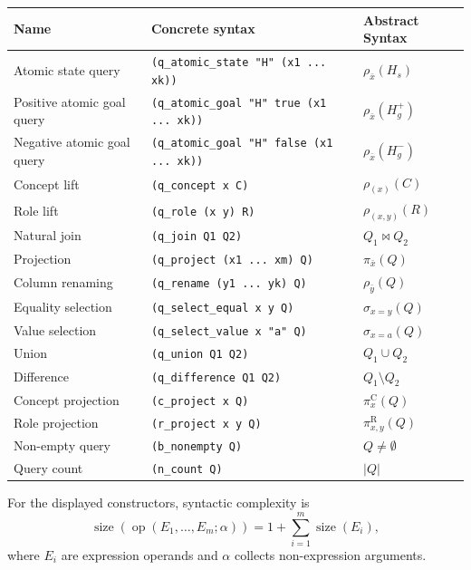 \documentclass[11pt]{article}
\newenvironment{compacttable}
  {\begingroup\setlength{\tabcolsep}{3pt}}
  {\endgroup}
\begin{document}
\begin{compacttable}
\begin{longtable}{>{\raggedright\arraybackslash}p{}
                  >{\raggedright\arraybackslash}p{}
                  >{\raggedright\arraybackslash}p{}}
\toprule
Name & Concrete syntax & Abstract Syntax \\
\midrule
\endhead
Atomic state query & \texttt{(q\_atomic\_state "H" (x1 ... xk))} & $\rho_{\bar x}(H_s)$ \\
Positive atomic goal query & \texttt{(q\_atomic\_goal "H" true (x1 ... xk))} & $\rho_{\bar x}(H_g^+)$ \\
Negative atomic goal query & \texttt{(q\_atomic\_goal "H" false (x1 ... xk))} & $\rho_{\bar x}(H_g^-)$ \\
Concept lift & \texttt{(q\_concept x C)} & $\rho_{(x)}(C)$ \\
Role lift & \texttt{(q\_role (x y) R)} & $\rho_{(x,y)}(R)$ \\
Natural join & \texttt{(q\_join Q1 Q2)} & $Q_1\bowtie Q_2$ \\
Projection & \texttt{(q\_project (x1 ... xm) Q)} & $\pi_{\bar x}(Q)$ \\
Column renaming & \texttt{(q\_rename (y1 ... yk) Q)} & $\rho_{\bar y}(Q)$ \\
Equality selection & \texttt{(q\_select\_equal x y Q)} & $\sigma_{x=y}(Q)$ \\
Value selection & \texttt{(q\_select\_value x "a" Q)} & $\sigma_{x=a}(Q)$ \\
Union & \texttt{(q\_union Q1 Q2)} & $Q_1\cup Q_2$ \\
Difference & \texttt{(q\_difference Q1 Q2)} & $Q_1\setminus Q_2$ \\
\midrule
Concept projection & \texttt{(c\_project x Q)} & $\pi^{\mathrm C}_{x}(Q)$ \\
Role projection & \texttt{(r\_project x y Q)} & $\pi^{\mathrm R}_{x,y}(Q)$ \\
Non-empty query & \texttt{(b\_nonempty Q)} & $Q\neq\emptyset$ \\
Query count & \texttt{(n\_count Q)} & $|Q|$ \\
\bottomrule
\end{longtable}
\end{compacttable}

For the displayed constructors, syntactic complexity is
\[
  \operatorname{size}(\operatorname{op}(E_1,\ldots,E_m;\alpha))
  =1+\sum_{i=1}^{m}\operatorname{size}(E_i),
\]
where $E_i$ are expression operands and $\alpha$ collects non-expression arguments.
\end{document}
